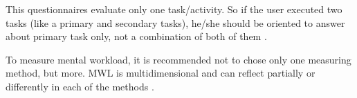             This questionnaires evaluate only one task/activity. So if the user executed two tasks (like a primary and secondary tasks), he/she should be oriented to answer about primary task only, not a combination of both of them \cite{sanders1998human}.

        To measure mental workload, it is recommended not to chose only one measuring method, but more. MWL is multidimensional and can reflect partially or differently in each of the methods \cite{sanders1998human}.


            
    

   

    
